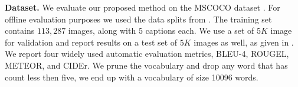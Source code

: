 \documentclass[10pt,twocolumn,letterpaper]{article}
\begin{document}

\noindent \textbf{Dataset.} We evaluate our proposed method on the  MSCOCO dataset \cite{MSCOCO}. For offline evaluation purposes we used the data splits from  \cite{Karpathy}. The training set contains $113,287$ images, along with $5$ captions each. We use a set of $5K$ image for validation and report results  on a test set of 
$5K$ images as well,  as given in \cite{Karpathy}. We report four  widely used automatic evaluation metrics, BLEU-4, ROUGEL, METEOR, and CIDEr. We prune the vocabulary and drop any word that has count less then five, we end up with a vocabulary of size 10096 words.\\
\end{document}
